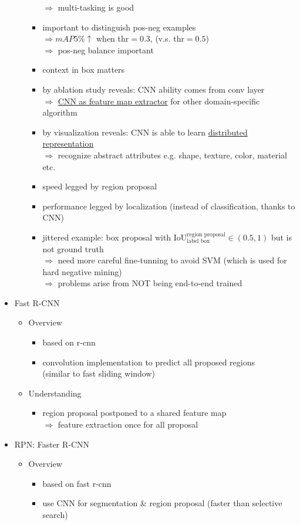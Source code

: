 \begin{itemize}
\begin{itemize}
\begin{itemize}
		$\Rightarrow$ multi-tasking is good
		\item important to distinguish pos-neg examples \\ 
		$\Rightarrow mAP 5\%\uparrow$ when thr$=0.3$, (v.s. thr$=0.5$) \\
		$\Rightarrow$ pos-neg balance important
		\item context in box matters
		\item by ablation study reveals: CNN ability comes from conv layer \\
		$\Rightarrow$ \underline{CNN as feature map extractor} for other domain-specific algorithm
		\item by visualization reveals: CNN is able to learn \underline{distributed representation} \\
		$\Rightarrow$ recognize abstract attributes e.g. shape, texture, color, material etc.
		\item speed legged by region proposal
		\item performance legged by localization (instead of classification, thanks to CNN)
		\item jittered example: box proposal with $\text{IoU}^\text{region proposal}_\text{label box}\in(0.5, 1)$ but is not ground truth \\
		$\Rightarrow$ need more careful fine-tunning to avoid SVM (which is used for hard negative mining) \\
		$\Rightarrow$ problems arise from NOT being end-to-end trained
		\end{itemize}
	\end{itemize}

\item Fast R-CNN
	\begin{itemize}
	\item Overview
		\begin{itemize}
		\item based on r-cnn
		\item convolution implementation to predict all proposed regions \\
		(similar to fast sliding window)
		\end{itemize}
	\item Understanding
		\begin{itemize}
		\item region proposal postponed to a shared feature map \\
		$\Rightarrow$ feature extraction once for all proposal
		\end{itemize}
	\end{itemize}

\item RPN: Faster R-CNN
	\begin{itemize}
	\item Overview
		\begin{itemize}
		\item based on fast r-cnn
		\item use CNN for segmentation \& region proposal (faster than selective search)
		\end{itemize}
	\end{itemize}
\end{itemize}

